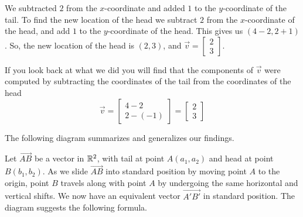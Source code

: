 \documentclass{ximera}
\begin{document}
We subtracted $2$ from the $x$-coordinate and added $1$ to the $y$-coordinate of the tail. To find the new location of the head we subtract $2$ from the $x$-coordinate of the head, and add $1$ to the $y$-coordinate of the head.  This gives us  $(4-2, 2+1)$.  So, the new location of the head is $(2, 3)$, and $\vec{v}=\begin{bmatrix}2\\3\end{bmatrix}$.

If you look back at what we did you will find that the components of $\vec{v}$ were computed by subtracting the coordinates of the tail from the coordinates of the head
$$\vec{v}=\begin{bmatrix}4-2\\ 2-(-1)\end{bmatrix}=\begin{bmatrix}2\\3\end{bmatrix}$$


The following diagram summarizes and generalizes our findings.

\begin{center}
\end{center}
Let $\overrightarrow{AB}$ be a vector in $\mathbb{R}^2$, with tail at point $A(a_1, a_2)$ and head at point $B(b_1, b_2)$.
As we slide $\overrightarrow{AB}$ into standard position by moving point $A$ to the origin, point $B$ travels along with point $A$ by undergoing the same horizontal and vertical shifts.  We now have an equivalent vector $\overrightarrow{A'B'}$ in standard position.  The diagram suggests the following formula.
\end{document}
